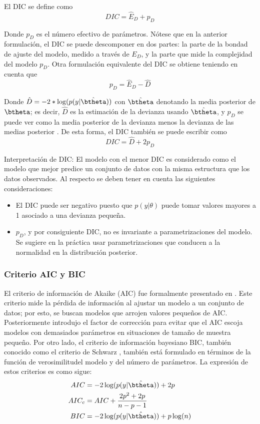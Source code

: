 \documentclass[10pt,openright]{book}\usepackage[]{graphicx}\usepackage[]{color}
\begin{document}
El DIC se define como
\begin{equation*}
DIC=\hat{E}_D+p_D
\end{equation*}

Donde $p_D$ es el número efectivo de parámetros. Nótese que en la anterior formulación, el DIC se puede descomponer en dos partes: la parte de la bondad de ajuste del modelo, medido a través de $E_D$,  y la parte que mide la complejidad del modelo $p_D$. Otra formulación equivalente del DIC se obtiene teniendo en cuenta que
\begin{equation*}
p_D=\hat{E}_D - \hat{D}
\end{equation*}

Donde $\hat{D}=-2*\log(p(y|\hat{\btheta}))$ con $\hat{\btheta}$ denotando la media posterior de $\btheta$; es decir, $\hat{D}$ es la estimación de la devianza usando $\hat{\btheta}$, y $p_D$ se puede ver como la media posterior de la devianza menos la devianza de las medias posterior \cite{Spiegel}. De esta forma, el DIC también se puede escribir como
\begin{equation*}
DIC=\hat{D}+2p_D
\end{equation*}

Interpretación de DIC: El modelo con el menor DIC es considerado como el modelo que mejor predice un conjunto de datos con la misma estructura que los datos observados. Al respecto se deben tener en cuenta las siguientes consideraciones:

\begin{itemize}
  \item El DIC puede ser negativo puesto que $p(y|\theta)$ puede tomar valores mayores a 1 asociado a una devianza pequeña.
  \item $p_D$, y por consiguiente DIC, no es invariante a parametrizaciones del modelo. Se sugiere en la práctica usar parametrizaciones que conducen a la normalidad en la distribución posterior.
\end{itemize}

\subsubsection*{Criterio AIC y BIC}

El criterio de información de Akaike (AIC) fue formalmente presentado en . Este criterio mide la pérdida de información al ajustar un modelo a un conjunto de datos; por esto, se buscan modelos que arrojen valores pequeños de AIC. Posteriormente  introdujo el factor de corrección para evitar que el AIC escoja modelos con demasiados parámetros en situaciones de tamaño de muestra pequeño. Por otro lado, el criterio de información bayesiano BIC, también conocido como el criterio de Schwarz \cite{Schwarz}, también está formulado en términos de la función de verosimilitudel modelo y del número de parámetros. La expresión de estos criterios es como sigue:
\begin{align*}
AIC&=-2\log(p(y|\hat{\btheta}))+2p\\
AIC_c&=AIC+\frac{2p^2+2p}{n-p-1}\\
BIC&=-2\log(p(y|\hat{\btheta}))+p\log(n)
\end{align*}
\end{document}
